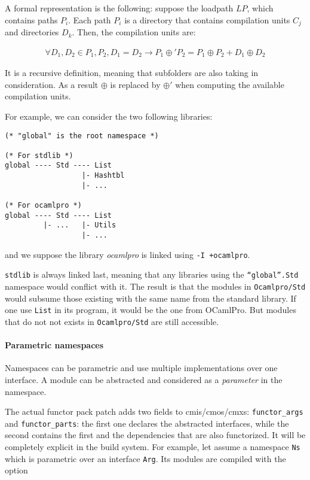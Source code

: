 A formal representation is the following: suppose the loadpath $LP$, which
contains paths $P_i$. Each path $P_i$ is a directory that contains compilation
units $C_j$ and directories $D_k$. Then, the compilation units are:

\begin{multline}
\forall D_1, D_2 \in P_1, P_2, D_1 = D_2
\rightarrow P_1 \oplus' P_2 = P_1 \oplus P_2 + D_1 \oplus D_2
\label{ns-merge} 
\end{multline}

It is a recursive definition, meaning that subfolders are also taking in
consideration. As a result $\oplus$ is replaced by $\oplus'$ when computing the
available compilation units.

For example, we can consider the two following libraries:

\begin{verbatim}
(* "global" is the root namespace *)

(* For stdlib *)
global ---- Std ---- List
                  |- Hashtbl
                  |- ...

(* For ocamlpro *)
global ---- Std ---- List
         |- ...   |- Utils
                  |- ...
\end{verbatim}
and we suppose the library \emph{ocamlpro} is linked using \texttt{-I +ocamlpro}.

\texttt{stdlib} is always linked last, meaning that any libraries using the
\texttt{``global''.Std} namespace would conflict with it. The result is that the
modules in \texttt{Ocamlpro/Std} would subsume those existing with the same name
from the standard library. If one use \texttt{List} in its program, it would be
the one from OCamlPro. But modules that do not not exists in
\texttt{Ocamlpro/Std} are still accessible.


\paragraph{Parametric namespaces}

Namespaces can be parametric and use multiple implementations over one
interface. A module can be abstracted and considered as a \emph{parameter} in
the namespace. 

The actual functor pack patch adds two fields to cmis/cmos/cmxs:
\lstinline{functor_args} and \lstinline{functor_parts}: the first one declares
the abstracted interfaces, while the second contains the first and the
dependencies that are also functorized. It will be completely explicit in the
build system. For example, let assume a namespace \texttt{Ns} which is
parametric over an interface \texttt{Arg}. Its modules are compiled with the
option

